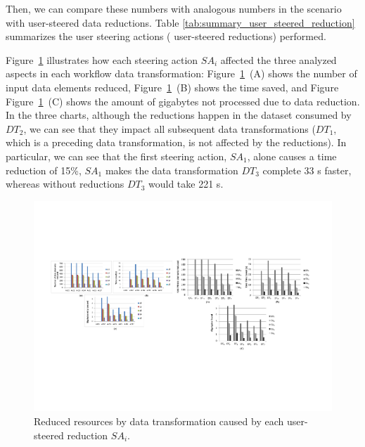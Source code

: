 Then, we can compare these numbers with analogous numbers in the
scenario with user-steered data reductions. Table \ref{tab:summary_user_steered_reduction} summarizes the user
steering actions (\ie{} user-steered reductions) performed.



Figure~\ref{fig:data_red_user_steered_red} 
illustrates how each
steering action $SA_i$ affected the three analyzed aspects in each
workflow data transformation: Figure~\ref{fig:data_red_user_steered_red}~(A) shows the number of input data elements
reduced, Figure~\ref{fig:data_red_user_steered_red}~(B) shows the time saved, and Figure Figure~\ref{fig:data_red_user_steered_red}~(C) shows the
amount of gigabytes not processed due to data reduction. In the three
charts, although the reductions happen in the dataset  consumed by
$DT_2$, we can see that they impact all subsequent
data transformations ($DT_1$, which is a preceding data transformation, is not
affected by the reductions). In particular, we can see that the first
steering action, $SA_1$, alone causes a time reduction of 15\%, \ie{} $SA_1$
makes the data transformation $DT_3$ complete 33 s faster, whereas without
reductions $DT_3$ would take 221 s.


\begin{figure}
    \centering
    \includegraphics[width=\textwidth,keepaspectratio]{img/reductions-per-dt.pdf}
    \caption{Reduced resources by data transformation caused by each user-steered reduction $SA_i$.}
    \label{fig:data_red_user_steered_red}
\end{figure}


